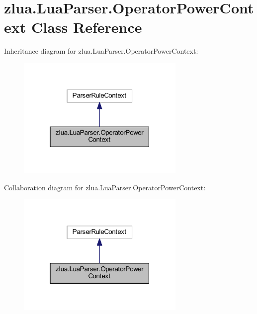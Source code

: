 \hypertarget{classzlua_1_1_lua_parser_1_1_operator_power_context}{}\section{zlua.\+Lua\+Parser.\+Operator\+Power\+Context Class Reference}
\label{classzlua_1_1_lua_parser_1_1_operator_power_context}


Inheritance diagram for zlua.\+Lua\+Parser.\+Operator\+Power\+Context\+:
\nopagebreak
\begin{figure}[H]
\begin{center}
\leavevmode
\includegraphics[width=229pt]{classzlua_1_1_lua_parser_1_1_operator_power_context__inherit__graph}
\end{center}
\end{figure}


Collaboration diagram for zlua.\+Lua\+Parser.\+Operator\+Power\+Context\+:
\nopagebreak
\begin{figure}[H]
\begin{center}
\leavevmode
\includegraphics[width=229pt]{classzlua_1_1_lua_parser_1_1_operator_power_context__coll__graph}
\end{center}
\end{figure}
